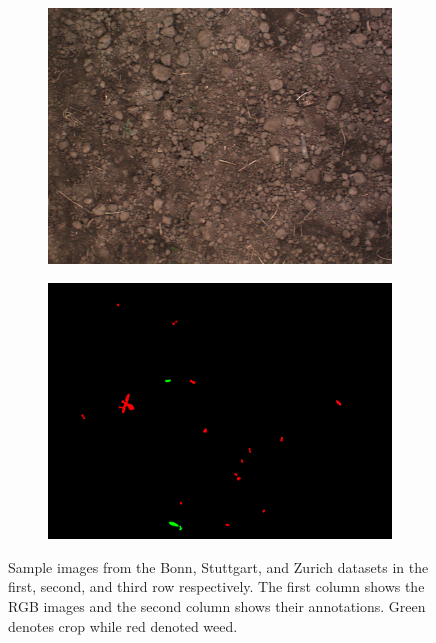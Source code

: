 \documentclass[letterpaper, 10 pt, conference]{ieeeconf}  %
\begin{document}
\begin{figure}
        \begin{subfigure}[b]{0.49\linewidth}
    \includegraphics[width=\linewidth]{pics/zurich/images/bonirob_2016-10-13-09-03-00_0_frame66.png}
   		\caption{}
		\label{zurich_img}    		
    \vspace{1em}
   \end{subfigure}
        \begin{subfigure}[b]{0.49\linewidth}
    \includegraphics[width=\linewidth]{pics/zurich/annotations/bonirob_2016-10-13-09-03-00_0_frame66.png}
   		\caption{}
		\label{zurich_lbl}    		
    \vspace{1em}
   \end{subfigure}
    \caption{Sample images from the Bonn, Stuttgart, and Zurich datasets in the first, second, and third row respectively. The first column shows the RGB images and the second column shows their annotations. Green denotes crop while red denoted weed.}
    \label{fig:datasets_images}
\end{figure}
\end{document}
